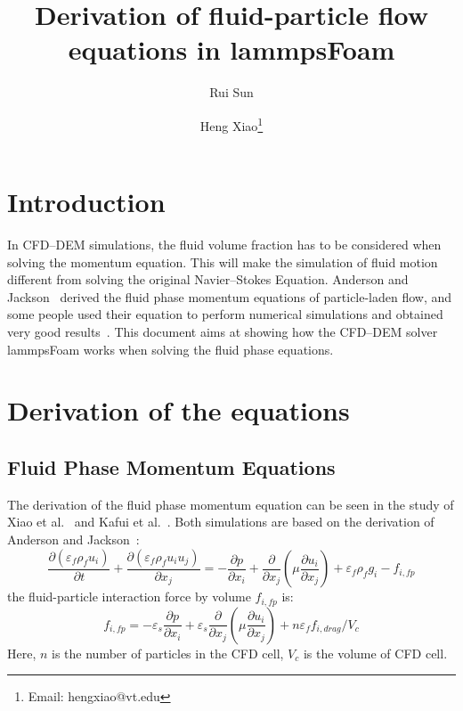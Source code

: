 \documentclass[11pt]{article}
\title{Derivation of fluid-particle flow equations in lammpsFoam}
\author[1]{Rui Sun}
\author[1]{Heng Xiao\thanks{Email: hengxiao@vt.edu}}
\affil[1]{Department of Aerospace and Ocean Engineering, Virginia Tech, Blacksburg, Virginia, USA}
\date{}
\begin{document}
\maketitle
\tableofcontents

\section{Introduction}
\label{sec:intro}

In CFD--DEM simulations, the fluid volume fraction has to be considered when solving the momentum
equation. This will make the simulation of fluid motion different from solving the original
Navier--Stokes Equation. Anderson and Jackson~\cite{anderson67fm} derived the fluid phase momentum
equations of particle-laden flow, and some people used their equation to perform numerical
simulations and obtained very good results~\cite{xiao11ai}. This document aims at showing how the
CFD--DEM solver lammpsFoam works when solving the fluid phase equations.

\section{Derivation of the equations}

\subsection{Fluid Phase Momentum Equations}
The derivation of the fluid phase momentum equation can be seen in the study of Xiao et
al.~\cite{xiao11ai} and Kafui et al.~\cite{kafui02dp}. Both simulations are based on the derivation
of Anderson and Jackson~\cite{anderson67fm}:
\begin{equation}
  \frac{\partial (\varepsilon_f \rho_f u_i)}{\partial t}
  +\frac{\partial (\varepsilon_f \rho_f u_i u_j)}{\partial x_j} = 
  - \frac{\partial p}{\partial x_i}
  + \frac{\partial}{\partial x_j}\left(\mu \frac{\partial u_i}{\partial x_j}\right)
  + \varepsilon_f \rho_f g_i
  - f_{i,fp}
\label{eqn:NS-DEM-fluid}
\end{equation}
the fluid-particle interaction force by volume $f_{i,fp}$ is:
\begin{equation}
  f_{i,fp} = -\varepsilon_s \frac{\partial p}{\partial x_i} +
  \varepsilon_s\frac{\partial}{\partial x_j}\left(\mu \frac{\partial u_i}{\partial x_j}\right)
  + n \varepsilon_f f_{i,drag}/V_{c}
\label{eqn:NS-DEM-ffp}
\end{equation}
Here, $n$ is the number of particles in the CFD cell, $V_{c}$ is the volume of CFD cell.
\end{document}
